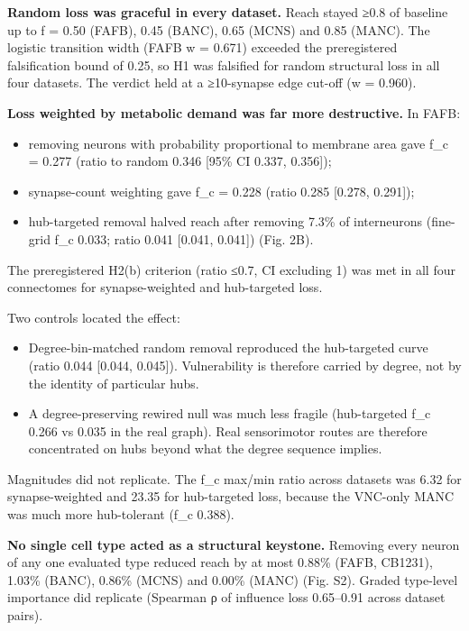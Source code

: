 \documentclass[11pt]{article}
\providecommand{\tightlist}{\setlength{\itemsep}{0pt}\setlength{\parskip}{0pt}}
\begin{document}
\textbf{Random loss was graceful in every dataset.} Reach stayed ≥0.8 of baseline up to f = 0.50 (FAFB), 0.45 (BANC), 0.65 (MCNS) and 0.85 (MANC). The logistic transition width (FAFB w = 0.671) exceeded the preregistered falsification bound of 0.25, so H1 was falsified for random structural loss in all four datasets. The verdict held at a ≥10-synapse edge cut-off (w = 0.960).

\textbf{Loss weighted by metabolic demand was far more destructive.} In FAFB:

\begin{itemize}
\tightlist
\item
  removing neurons with probability proportional to membrane area gave f\_c = 0.277 (ratio to random 0.346 {[}95\% CI 0.337, 0.356{]});
\item
  synapse-count weighting gave f\_c = 0.228 (ratio 0.285 {[}0.278, 0.291{]});
\item
  hub-targeted removal halved reach after removing 7.3\% of interneurons (fine-grid f\_c 0.033; ratio 0.041 {[}0.041, 0.041{]}) (Fig. 2B).
\end{itemize}

The preregistered H2(b) criterion (ratio ≤0.7, CI excluding 1) was met in all four connectomes for synapse-weighted and hub-targeted loss.

Two controls located the effect:

\begin{itemize}
\tightlist
\item
  Degree-bin-matched random removal reproduced the hub-targeted curve (ratio 0.044 {[}0.044, 0.045{]}). Vulnerability is therefore carried by degree, not by the identity of particular hubs.
\item
  A degree-preserving rewired null was much less fragile (hub-targeted f\_c 0.266 vs 0.035 in the real graph). Real sensorimotor routes are therefore concentrated on hubs beyond what the degree sequence implies.
\end{itemize}

Magnitudes did not replicate. The f\_c max/min ratio across datasets was 6.32 for synapse-weighted and 23.35 for hub-targeted loss, because the VNC-only MANC was much more hub-tolerant (f\_c 0.388).

\textbf{No single cell type acted as a structural keystone.} Removing every neuron of any one evaluated type reduced reach by at most 0.88\% (FAFB, CB1231), 1.03\% (BANC), 0.86\% (MCNS) and 0.00\% (MANC) (Fig. S2). Graded type-level importance did replicate (Spearman ρ of influence loss 0.65--0.91 across dataset pairs).
\end{document}
